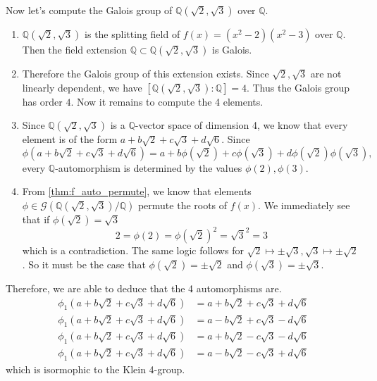   \begin{example}
    Now let's compute the Galois group of $\mathbb{Q}(\sqrt{2}, \sqrt{3})$ over $\mathbb{Q}$. 
    \begin{enumerate}
      \item $\mathbb{Q}(\sqrt{2}, \sqrt{3})$ is the splitting field of $f(x) = (x^2 - 2)(x^2 - 3)$ over $\mathbb{Q}$. Then the field extension $\mathbb{Q} \subset \mathbb{Q}(\sqrt{2}, \sqrt{3})$ is Galois. 

      \item Therefore the Galois group of this extension exists. Since $\sqrt{2}, \sqrt{3}$ are not linearly dependent, we have $[\mathbb{Q}(\sqrt{2}, \sqrt{3}):\mathbb{Q}] = 4$. Thus the Galois group has order $4$. Now it remains to compute the 4 elements. 

      \item Since $\mathbb{Q}(\sqrt{2}, \sqrt{3})$ is a $\mathbb{Q}$-vector space of dimension 4, we know that every element is of the form $a + b \sqrt{2} + c \sqrt{3} + d \sqrt{6}$. Since 
      \begin{equation}
        \phi(a + b \sqrt{2} + c \sqrt{3} + d \sqrt{6}) = a + b \phi(\sqrt{2}) + c \phi(\sqrt{3}) + d \phi(\sqrt{2}) \phi(\sqrt{3}), 
      \end{equation}
      every $\mathbb{Q}$-automorphism is determined by the values $\phi(2), \phi(3)$. 

    \item From \ref{thm:f_auto_permute}, we know that elements $\phi \in \mathcal{G}(\mathbb{Q}(\sqrt{2}, \sqrt{3}) / \mathbb{Q})$ permute the roots of $f(x)$. We immediately see that if $\phi(\sqrt{2}) = \sqrt{3}$
      \begin{equation}
        2 = \phi(2) = \phi(\sqrt{2})^2 = \sqrt{3}^2 = 3
      \end{equation}
      which is a contradiction. The same logic follows for $\sqrt{2} \mapsto \pm \sqrt{3}, \sqrt{3} \mapsto \pm \sqrt{2}$. So it must be the case that $\phi(\sqrt{2}) = \pm \sqrt{2}$ and $\phi(\sqrt{3}) = \pm \sqrt{3}$. 
    \end{enumerate}
    Therefore, we are able to deduce that the 4 automorphisms are. 
    \begin{align}
      \phi_1 (a + b \sqrt{2} + c \sqrt{3} + d \sqrt{6}) & = a + b \sqrt{2} + c \sqrt{3} + d \sqrt{6} \\
      \phi_1 (a + b \sqrt{2} + c \sqrt{3} + d \sqrt{6}) & = a - b \sqrt{2} + c \sqrt{3} - d \sqrt{6} \\
      \phi_1 (a + b \sqrt{2} + c \sqrt{3} + d \sqrt{6}) & = a + b \sqrt{2} - c \sqrt{3} - d \sqrt{6} \\
      \phi_1 (a + b \sqrt{2} + c \sqrt{3} + d \sqrt{6}) & = a - b \sqrt{2} - c \sqrt{3} + d \sqrt{6}
    \end{align}
    which is isormophic to the Klein 4-group. 
  \end{example}

